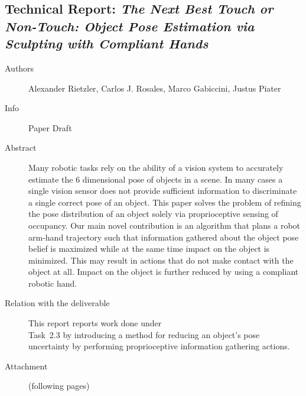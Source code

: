 \documentclass[a4paper,11pt,pdf]{../templates/pacmanreport}
\begin{document}
\subsection{Technical Report: \em The Next Best Touch or Non-Touch:
Object Pose Estimation via Sculpting with Compliant Hands}
\begin{description}
    \item[Authors] Alexander Rietzler, Carlos J. Rosales, Marco Gabiccini, Justus Piater
    \item[Info] Paper Draft%
    \item[Abstract] Many robotic tasks rely on the ability of a vision system to accurately estimate the 6 dimensional pose of objects in a scene.
In many cases a single vision sensor does not provide sufficient information to discriminate a single correct
pose of an object. 
This paper solves the problem of refining the pose distribution 
of an object solely via proprioceptive sensing of occupancy.
Our main novel contribution is an algorithm that plans a robot arm-hand trajectory such that 
information gathered about the object pose belief is maximized while at the same time impact on the object is minimized. 
This may result in actions that do not make contact with the object at all.
Impact on the object is further reduced by using a compliant robotic hand.
    \item [Relation with the deliverable] This report reports work done under\\ Task~2.3 by introducing a method for reducing an object's pose uncertainty by performing proprioceptive information
    gathering actions.
    \item[Attachment] (following pages) %
\end{description}

\end{document}
